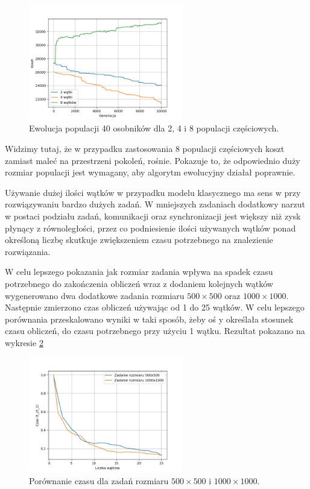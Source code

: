 \begin{figure}[H]
    \centering        
    \includegraphics[width=0.6\textwidth]{img/zla_zbieznosc_watki.png}
    \caption{Ewolucja populacji 40 osobników dla 2, 4 i 8 populacji częściowych.}
    \label{zla_zbieznosc_watki}
\end{figure}

Widzimy tutaj, że w przypadku zastosowania 8 populacji częściowych koszt zamiast maleć na przestrzeni pokoleń, rośnie. Pokazuje to, że odpowiednio 
duży rozmiar populacji jest wymagany, aby algorytm ewolucyjny działał poprawnie.

Używanie dużej ilości wątków w przypadku modelu klasycznego ma sens w przy rozwiązywaniu bardzo dużych zadań. W mniejszych zadaniach dodatkowy narzut w 
postaci podziału zadań, komunikacji oraz synchronizacji jest większy niż zysk płynący z równoległości, przez co podniesienie ilości używanych wątków ponad 
określoną liczbę skutkuje zwiększeniem czasu potrzebnego na znalezienie rozwiązania. 

W celu lepszego pokazania jak rozmiar zadania wpływa na spadek czasu potrzebnego do zakończenia obliczeń wraz z dodaniem kolejnych wątków wygenerowano 
dwa dodatkowe zadania rozmiaru $500 \times 500$ oraz $1000 \times 1000$. Następnie zmierzono czas obliczeń używając od 1 do 25 wątków. W celu lepszego 
porównania przeskalowano wyniki w taki sposób, żeby oś y określała stosunek czasu obliczeń, do czasu potrzebnego przy użyciu 1 wątku. Rezultat 
pokazano na wykresie \ref{threads_comparsion_500x500_1000x1000}

\begin{figure}[H]
    \centering        
    \includegraphics[width=0.6\textwidth]{img/compare_500_1000.png}
    \caption{Porównanie czasu dla zadań rozmiaru $500 \times 500$ i $1000 \times 1000$.}
    \label{threads_comparsion_500x500_1000x1000}
\end{figure}

